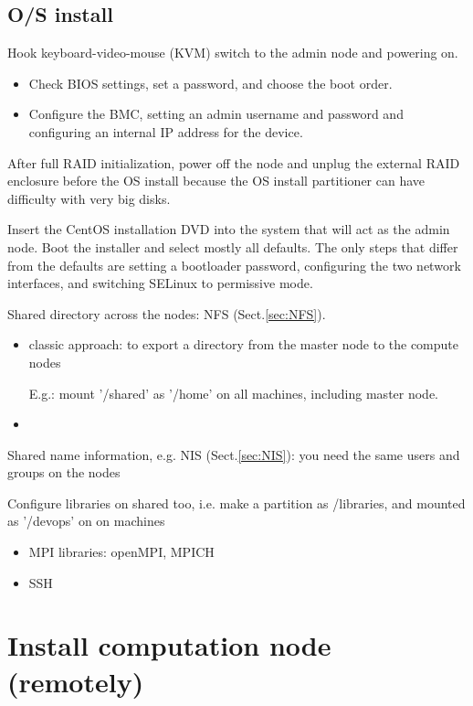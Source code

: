 \subsection{O/S install}

Hook keyboard-video-mouse (KVM) switch to the admin node and powering on.
\begin{itemize}
  \item  Check BIOS settings, set a password, and choose the boot order. 
  
  \item Configure the BMC, setting an admin username and password and
  configuring an internal IP address for the device.
\end{itemize} 


After full RAID initialization, power off the node and unplug the external RAID
enclosure before the OS install because the OS install partitioner can have
difficulty with very big disks.


Insert the CentOS installation DVD into the system that will act as the admin
node. Boot the installer and select mostly all defaults. The only steps that
differ from the defaults are setting a bootloader password, configuring the two
network interfaces, and switching SELinux to permissive mode.



Shared directory across the nodes: NFS (Sect.\ref{sec:NFS}).
\begin{itemize}
  \item classic approach: to export a directory from the master node to the
  compute nodes
  
E.g.: mount '/shared' as '/home' on all machines, including master node.

  \item
\end{itemize}

Shared name information, e.g. NIS (Sect.\ref{sec:NIS}):  you need the same users
and groups on the nodes


Configure libraries on shared too, i.e. make a partition as /libraries, and
mounted as '/devops' on on machines
\begin{itemize}
  \item MPI libraries: openMPI, MPICH
  
  \item SSH
\end{itemize}


\section{Install computation node (remotely)}

